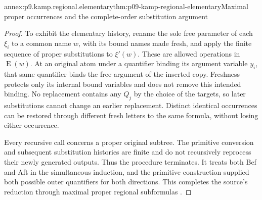 \begin{annexitem}{annex:p9.kamp.regional.elementary}{thm:p09-kamp-regional-elementary}{Maximal proper occurrences and the complete-order substitution argument}
\begin{proof}
To exhibit the elementary history, rename the sole free parameter
of each \(\xi_i\) to a common name \(w\), with its
bound names made fresh, and apply the finite sequence of proper
substitutions to \(\xi'(w)\). These are allowed operations
in \(\operatorname{E}(w)\). At an original atom under a
quantifier binding its argument variable \(y_i\), that same
quantifier binds the free argument of the inserted copy. Freshness
protects only its internal bound variables and does not remove
this intended binding. No replacement contains any \(Q_j\)
by the choice of the targets, so later substitutions cannot change
an earlier replacement. Distinct identical occurrences can be
restored through different fresh letters to the same formula,
without losing either occurrence.

Every recursive call concerns a proper original subtree. The
primitive conversion and subsequent substitution histories are finite
and do not recursively reprocess their newly generated outputs.
Thus the procedure terminates. It treats both Bef and Aft in
the simultaneous induction, and the primitive construction supplied
both possible outer quantifiers for both directions. This completes
the source's reduction through maximal proper regional subformulas
\cite[ch.~III, pp.~60--62]{Kamp1968}.
\end{proof}
\end{annexitem}

